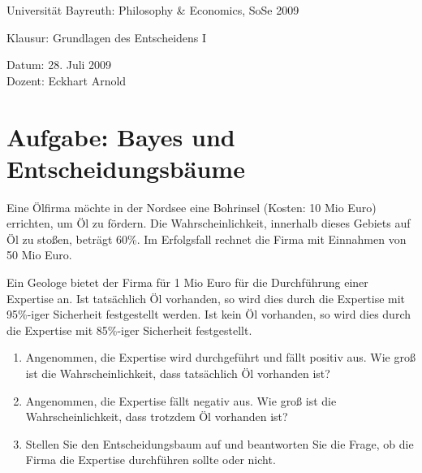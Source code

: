 \documentclass[10pt, a4paper, german]{article}
\numberwithin {equation}{section}
\begin{document}
\begin{center}
{\large Universität Bayreuth: Philosophy \& Economics, SoSe 2009}
\end{center}
\vspace{0.4em}
\begin{center}
{\huge Klausur: Grundlagen des Entscheidens I}
\end{center}
\vspace{0.0em}
\begin{center}
Datum: 28. Juli 2009\\
Dozent: Eckhart Arnold
\end{center}


\section{Aufgabe: Bayes und Entscheidungsbäume}

Eine Ölfirma möchte in der Nordsee eine Bohrinsel (Kosten: 10 Mio Euro)
errichten, um Öl zu fördern. 
Die Wahrscheinlichkeit, innerhalb dieses Gebiets auf Öl zu stoßen, beträgt 60\%.
Im Erfolgsfall rechnet die Firma mit Einnahmen von 50 Mio Euro. 

Ein Geologe bietet der Firma für 1 Mio Euro für die Durchführung einer Expertise
an. Ist tatsächlich Öl vorhanden, so wird dies durch die Expertise mit
95\%-iger Sicherheit festgestellt werden. Ist kein Öl vorhanden, so wird dies
durch die Expertise mit 85\%-iger Sicherheit festgestellt.

\begin{enumerate}
  \item Angenommen, die Expertise wird durchgeführt und fällt positiv aus. Wie
  groß ist die Wahrscheinlichkeit, dass tatsächlich Öl vorhanden ist?
  \item Angenommen, die Expertise fällt negativ aus. Wie groß ist die
  Wahrscheinlichkeit, dass trotzdem Öl vorhanden ist?
  \item Stellen Sie den Entscheidungsbaum auf und beantworten Sie die Frage, ob
  die Firma die Expertise durchführen sollte oder nicht.
\end{enumerate}
\end{document}
